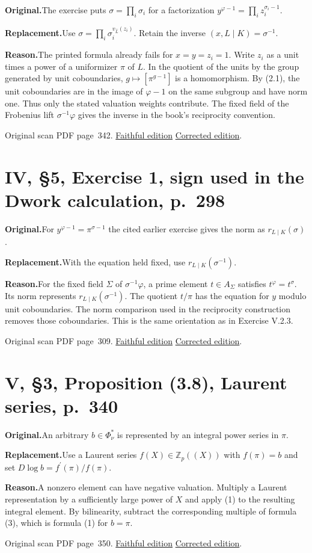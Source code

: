 \documentclass[11pt,a4paper]{article}
\newcommand{\original}{\par\smallskip\noindent\textbf{Original.}\enspace}
\newcommand{\replacement}{\par\smallskip\noindent\textbf{Replacement.}\enspace}
\newcommand{\reason}{\par\smallskip\noindent\textbf{Reason.}\enspace}
\newcommand{\editionlink}[3]{\href{#1\#errata.#2}{#3}}
\newcommand{\location}[2]{%
  \par\smallskip\noindent Original scan PDF page~#2.\enspace
  \editionlink{Neukirch_Faithful.pdf}{#1}{Faithful edition}
  \quad\editionlink{Neukirch_Corrected.pdf}{#1}{Corrected edition}.}
\begin{document}
\original The exercise puts $\sigma=\prod_i\sigma_i$ for a factorization $y^{\varphi-1}=\prod_i z_i^{\sigma_i-1}$.
\replacement Use $\sigma=\prod_i\sigma_i^{v_{\widehat L}(z_i)}$. Retain the inverse $(x,L\mid K)=\sigma^{-1}$.
\reason The printed formula already fails for $x=y=z_i=1$. Write $z_i$ as a unit times a power of a uniformizer $\pi$ of $L$. In the quotient of the units by the group generated by unit coboundaries, $g\mapsto[\pi^{g-1}]$ is a homomorphism. By (2.1), the unit coboundaries are in the image of $\varphi-1$ on the same subgroup and have norm one. Thus only the stated valuation weights contribute. The fixed field of the Frobenius lift $\sigma^{-1}\varphi$ gives the inverse in the book\textquoteright{}s reciprocity convention.
\location{116}{342}

\setcounter{section}{116}
\section{IV, \S5, Exercise 1, sign used in the Dwork calculation, p.~298}\label{errata:item:117}

\original For $y^{\varphi-1}=\pi^{\sigma-1}$ the cited earlier exercise gives the norm as $r_{L\mid K}(\sigma)$.
\replacement With the equation held fixed, use $r_{L\mid K}(\sigma^{-1})$.
\reason For the fixed field $\Sigma$ of $\sigma^{-1}\varphi$, a prime element $t\in A_\Sigma$ satisfies $t^\varphi=t^\sigma$. Its norm represents $r_{L\mid K}(\sigma^{-1})$. The quotient $t/\pi$ has the equation for $y$ modulo unit coboundaries. The norm comparison used in the reciprocity construction removes those coboundaries. This is the same orientation as in Exercise V.2.3.
\location{117}{309}

\setcounter{section}{117}
\section{V, \S3, Proposition (3.8), Laurent series, p.~340}\label{errata:item:118}

\original An arbitrary $b\in\Phi_\nu^*$ is represented by an integral power series in $\pi$.
\replacement Use a Laurent series $f(X)\in\mathbb Z_p((X))$ with $f(\pi)=b$ and set $D\log b=f^{\prime}(\pi)/f(\pi)$.
\reason A nonzero element can have negative valuation. Multiply a Laurent representation by a sufficiently large power of $X$ and apply (1) to the resulting integral element. By bilinearity, subtract the corresponding multiple of formula (3), which is formula (1) for $b=\pi$.
\location{118}{350}
\end{document}
